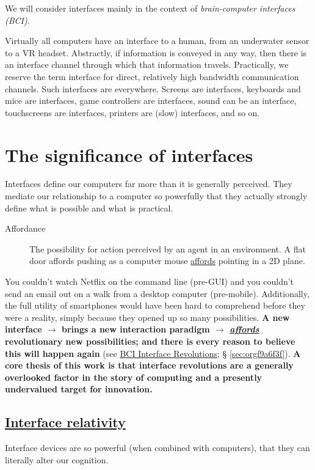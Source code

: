 \documentclass[logo,bsc,singlespacing,parskip]{infthesis}
\begin{document}
We will consider interfaces mainly in the context of \emph{brain-computer interfaces (BCI)}.

Virtually all computers have an interface to a human, from an underwater sensor to a VR headset.
Abstractly, if information is conveyed in any way, then there is an interface channel through which that information travels.
Practically, we reserve the term interface for direct, relatively high bandwidth communication channels.
Such interfaces are everywhere.
Screens are interfaces, keyboards and mice are interfaces, game controllers are interfaces, sound can be an interface, touchscreens are interfaces, printers are (slow) interfaces, and so on.
\section{The significance of interfaces}
\label{sec:org88a3490}
Interfaces define our computers far more than it is generally perceived.
They mediate our relationship to a computer so powerfully that they actually strongly define what is possible and what is practical.

\begin{mdframed}
\begin{description}
\item[{\label{org6e0ca2a}Affordance}] The possibility for action perceived by an agent in an environment. A flat door \label{org886d815}affords pushing as a computer mouse \hyperref[org886d815]{affords} pointing in a 2D plane.
\end{description}
\end{mdframed}

You couldn't watch Netflix on the command line (pre-GUI) and you couldn't send an email out on a walk from a desktop computer (pre-mobile).
Additionally, the full utility of smartphones would have been hard to comprehend before they were a reality, simply because they opened up so many possibilities.
\textbf{A new interface \(\rightarrow\) brings a new interaction paradigm \(\rightarrow\) \emph{\hyperref[org886d815]{affords}} revolutionary new possibilities; and there is every reason to believe this will happen again} (see \hyperref[sec:orgf9a6f3f]{BCI Interface Revolutions}; § \ref{sec:orgf9a6f3f}).
\textbf{A core thesis of this work is that interface revolutions are a generally overlooked factor in the story of computing and a presently undervalued target for innovation.}
\subsection{\hyperref[orgfb49b5a]{Interface relativity}}
\label{sec:org5a9d39d}
Interface devices are so powerful (when combined with computers), that they can literally alter our cognition.
\end{document}
